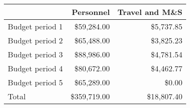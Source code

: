 \begin{tabular}{lrr}
\hline
{} &    Personnel & Travel and M\&S \\
\hline
Budget period 1 &   \$59,284.00 &      \$5,737.85 \\
Budget period 2 &   \$65,488.00 &      \$3,825.23 \\
Budget period 3 &   \$88,986.00 &      \$4,781.54 \\
Budget period 4 &   \$80,672.00 &      \$4,462.77 \\
Budget period 5 &   \$65,289.00 &          \$0.00 \\
\hline
Total           &  \$359,719.00 &     \$18,807.40 \\
\hline
\end{tabular}

